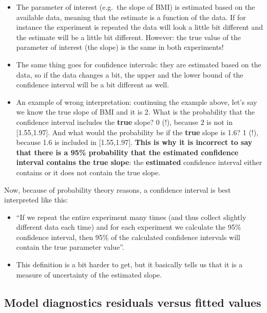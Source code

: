 \documentclass[
  letterpaper,
  8pt,
  a4paper]{book}
\providecommand{\tightlist}{%
  \setlength{\itemsep}{0pt}\setlength{\parskip}{0pt}}
\begin{document}
\begin{itemize}
\tightlist
\item
  The parameter of interest (e.g.~the slope of BMI) is estimated based
  on the available data, meaning that the estimate is a function of the
  data. If for instance the experiment is repeated the data will look a
  little bit different and the estimate will be a little bit different.
  However: the true value of the parameter of interest (the slope) is
  the same in both experiments!
\item
  The same thing goes for confidence intervals: they are estimated based
  on the data, so if the data changes a bit, the upper and the lower
  bound of the confidence interval will be a bit different as well.
\item
  An example of wrong interpretation: continuing the example above,
  let's say we know the true slope of BMI and it is 2. What is the
  probability that the confidence interval includes the \textbf{true}
  slope? 0 (!), because 2 is not in {[}1.55,1.97{]}. And what would the
  probability be if the \textbf{true} slope is 1.6? 1 (!), because 1.6
  is included in {[}1.55,1.97{]}. \textbf{This is why it is incorrect to
  say that there is a 95\% probability that the estimated confidence
  interval contains the true slope}: the \textbf{estimated} confidence
  interval either contains or it does not contain the true slope.
\end{itemize}

Now, because of probability theory reasons, a confidence interval is
best interpreted like this:

\begin{itemize}
\tightlist
\item
  ``If we repeat the entire experiment many times (and thus collect
  slightly different data each time) and for each experiment we
  calculate the 95\% confidence interval, then 95\% of the calculated
  confidence intervals will contain the true parameter value''.
\item
  This definition is a bit harder to get, but it basically tells us that
  it is a measure of uncertainty of the estimated slope.
\end{itemize}

\subsection*{Model diagnostics residuals versus fitted
values}\label{model-diagnostics-residuals-versus-fitted-values}
\end{document}
